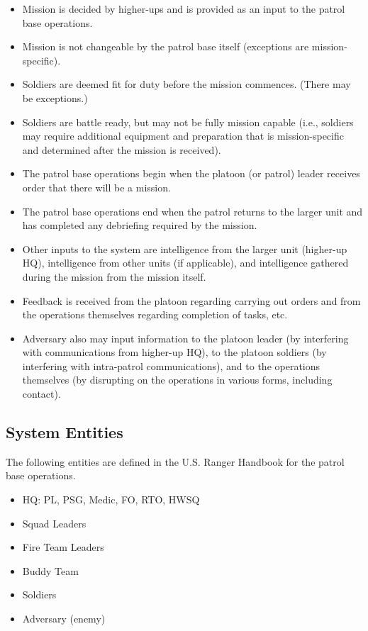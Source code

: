 \documentclass[../../main/main.tex]{subfiles}
\begin{document}
\begin{itemize}
\item Mission is decided by higher-ups and is provided as an input to the patrol base operations.
\item Mission is not changeable by the patrol base itself (exceptions are mission-specific).
\item Soldiers are deemed fit for duty before the mission commences.   (There may be exceptions.)
\item Soldiers are battle ready, but may not be fully mission capable (i.e., soldiers may require additional equipment and preparation that is mission-specific and determined after the mission is received).
\item The patrol base operations begin when the platoon (or patrol) leader receives order that there will be a mission.
\item The patrol base operations end when the patrol returns to the larger unit and has completed any debriefing required by the mission.
\item Other inputs to the system are intelligence from the larger unit (higher-up HQ), intelligence from other units (if applicable), and intelligence gathered during the mission from the mission itself. 
\item Feedback is received from the platoon regarding carrying out orders and from the operations themselves regarding completion of tasks, etc.  
\item Adversary also may input information to the platoon leader (by interfering with communications from higher-up HQ), to the platoon soldiers (by interfering with intra-patrol communications), and to the operations themselves (by disrupting on the operations in various forms, including contact).
\end{itemize}


\subsection{System Entities}
The following entities are defined in the U.S. Ranger Handbook for the patrol base operations.  
\begin{itemize}
\item HQ: PL, PSG, Medic, FO, RTO, HWSQ
\item Squad Leaders
\item Fire Team Leaders
\item Buddy Team
\item Soldiers
\item Adversary (enemy)
\end{itemize}
\end{document}

